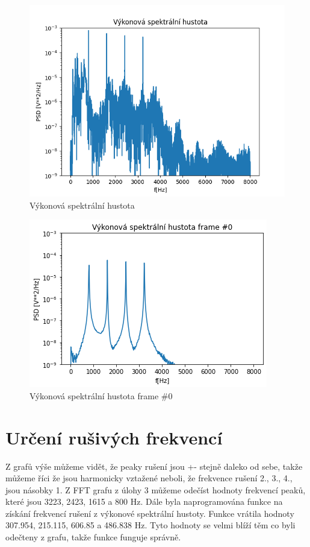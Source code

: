 \documentclass{article}
\begin{document}
\begin{figure}[H] 
	\centering
	\includegraphics[scale=0.7,keepaspectratio]{Figure_7}
	\caption{Výkonová spektrální hustota}
\end{figure}

\begin{figure}[H] 
	\centering
	\includegraphics[scale=0.7,keepaspectratio]{Figure_26}
	\caption{Výkonová spektrální hustota frame \#0}
\end{figure}

\section{Určení rušivých frekvencí}
Z grafů výše můžeme vidět, že peaky rušení jsou +- stejně daleko od sebe, takže můžeme říci že jsou harmonicky vztažené neboli, že frekvence rušení 2., 3., 4., jsou násobky 1.
Z FFT grafu z úlohy 3 můžeme odečíst hodnoty frekvencí peaků, které jsou 3223, 2423, 1615 a 800 Hz.
Dále byla naprogramována funkce na získání frekvencí rušení z výkonové spektrální hustoty.
Funkce vrátila hodnoty 307.954, 215.115, 606.85 a 486.838 Hz.
Tyto hodnoty se velmi blíží těm co byli odečteny z grafu, takže funkce funguje správně.
\end{document}
